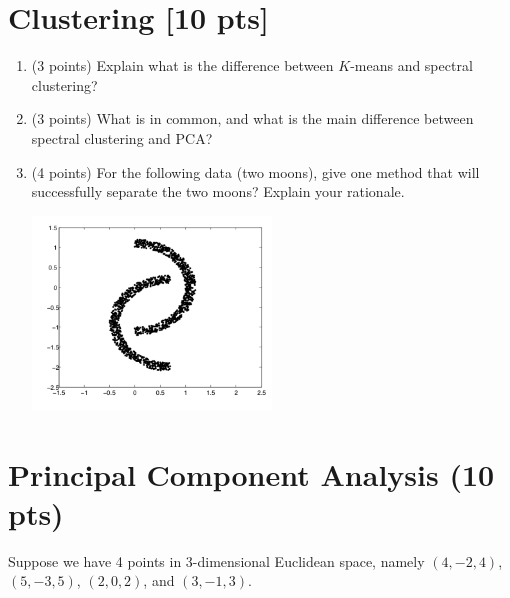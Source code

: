 \documentclass[a4paper,12pt,fleqn]{article}
\begin{document}
\clearpage
\section{Clustering [10 pts]}


\begin{enumerate}

\item (3 points) Explain what is the difference between $K$-means and spectral clustering? 

\vspace{1.5in}


\item (3 points) What is in common, and what is the main difference between spectral clustering and PCA?

\vspace{1.5in}

\item (4 points) For the following data (two moons), give one method that will successfully separate the two moons? Explain your rationale. 

\begin{center}
\includegraphics[width = 0.5\textwidth]{./fig/moon}
\end{center}

\end{enumerate}

\vspace{1.5in}
\section{Principal Component Analysis (10 pts)}

Suppose we have 4 points in 3-dimensional Euclidean space, namely $(4,-2,4)$, $(5,-3,5)$, $(2,0,2)$, and $(3,-1,3)$.

%
\vspace{.1in}
\end{document}
